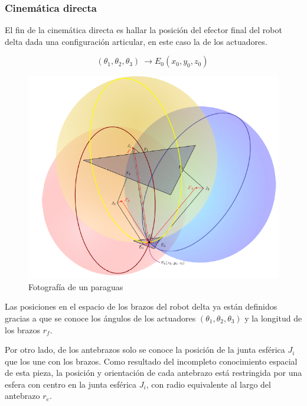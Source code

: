         
        
        
        \newpage

    
        \subsubsection{Cinemática directa} \label{ma_cd}
        El fin de la cinemática directa es hallar la posición del efector final del robot delta dada una configuración articular, en este caso la de los actuadores.

        \begin{equation}
            \left({\theta }_1,{\theta }_2,{\theta }_3\right)\ \to E_0(x_0,y_0,z_0)\
        \end{equation}

        \begin{figure}[htb]
             \centering
             \includegraphics[width=0.8\linewidth]{Main/Chapter4/Images4/Metodo_A_Modelacion_Cinematica_Posicion_3.png}
              \caption{Fotografía de un paraguas}
              \label{f:Cap4_Metodo_A_Modelacion_Cinematica_Posicion_3}
        \end{figure}
        
        Las posiciones en el espacio de los brazos del robot delta ya están definidos gracias a que se conoce los ángulos de los actuadores $({\theta }_1,{\theta }_2,{\theta }_3)$ y la longitud de los brazos $r_f$. 
        
        Por otro lado, de los antebrazos solo se conoce la posición de la junta esférica $J_i$ que los une con los brazos. Como resultado del incompleto conocimiento espacial de esta pieza, la posición y orientación de cada antebrazo está restringida por una esfera con centro en la junta esférica $J_i$, con radio equivalente al largo del antebrazo $r_e$. 
        
